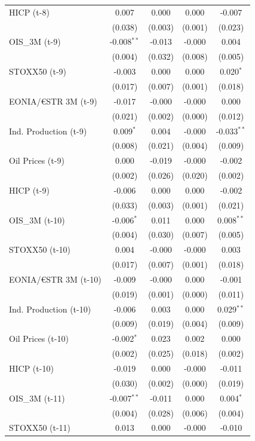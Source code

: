 \begin{longtable}[t]{lcccc}
HICP (t-8) & 0.007 & 0.000 & 0.000 & -0.007\\
 & (0.038) & (0.003) & (0.001) & (0.023)\\
OIS\_3M (t-9) & -0.008$^{**}$ & -0.013 & -0.000 & 0.004\\
 & (0.004) & (0.032) & (0.008) & (0.005)\\
STOXX50 (t-9) & -0.003 & 0.000 & 0.000 & 0.020$^{*}$\\
 & (0.017) & (0.007) & (0.001) & \vphantom{1} (0.018)\\
EONIA/€STR 3M (t-9) & -0.017 & -0.000 & -0.000 & 0.000\\
 & (0.021) & (0.002) & (0.000) & (0.012)\\
Ind. Production (t-9) & 0.009$^{*}$ & 0.004 & -0.000 & -0.033$^{**}$\\
 & (0.008) & (0.021) & (0.004) & (0.009)\\
Oil Prices (t-9) & 0.000 & -0.019 & -0.000 & -0.002\\
 & (0.002) & (0.026) & (0.020) & (0.002)\\
HICP (t-9) & -0.006 & 0.000 & 0.000 & -0.002\\
 & (0.033) & (0.003) & (0.001) & (0.021)\\
OIS\_3M (t-10) & -0.006$^{*}$ & 0.011 & 0.000 & 0.008$^{**}$\\
 & (0.004) & (0.030) & (0.007) & (0.005)\\
STOXX50 (t-10) & 0.004 & -0.000 & -0.000 & 0.003\\
 & (0.017) & (0.007) & (0.001) & (0.018)\\
EONIA/€STR 3M (t-10) & -0.009 & -0.000 & 0.000 & -0.001\\
 & (0.019) & (0.001) & (0.000) & (0.011)\\
Ind. Production (t-10) & -0.006 & 0.003 & 0.000 & 0.029$^{**}$\\
 & (0.009) & (0.019) & (0.004) & (0.009)\\
Oil Prices (t-10) & -0.002$^{*}$ & 0.023 & 0.002 & 0.000\\
 & (0.002) & (0.025) & (0.018) & (0.002)\\
HICP (t-10) & -0.019 & 0.000 & -0.000 & -0.011\\
 & (0.030) & (0.002) & (0.000) & (0.019)\\
OIS\_3M (t-11) & -0.007$^{**}$ & -0.011 & 0.000 & 0.004$^{*}$\\
 & (0.004) & (0.028) & (0.006) & (0.004)\\
STOXX50 (t-11) & 0.013 & 0.000 & -0.000 & -0.010\\

\end{longtable}
